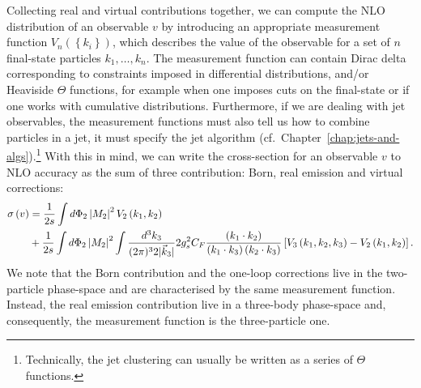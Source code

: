 Collecting real and virtual contributions together, we can compute the
NLO distribution of an observable $v$ by introducing an
appropriate measurement function
$V_{n}\left(\left\{k_i\right\}\right)$, which describes
%
the value of the observable for a set of $n$ final-state particles
$k_1,\dots,k_n$.
%
The measurement function can contain Dirac delta corresponding to
constraints imposed in differential distributions, and/or Heaviside
$\Theta$ functions, for example when one imposes cuts on the
final-state or if one works with cumulative distributions.
%
Furthermore, if we are dealing with jet observables, the measurement
functions must also tell us how to combine particles in a jet, \ie it
must specify the jet algorithm
(cf.~Chapter~\ref{chap:jets-and-algs}).\footnote{Technically, the jet
  clustering can usually be written as a series of $\Theta$
  functions.}  With this in mind, we can write the cross-section for
an observable $v$ to NLO accuracy as the sum of three contribution:
Born, real emission and virtual corrections:
\begin{align}\label{eq:real-virtual-together}
\sigma\left(v\right)&=\frac{1}{2s}\int d\Phi_2\left|M_2\right|^{2}V_2\left(k_1,k_2\right)\\
&+\frac{1}{2s}\int d\Phi_2\left|M_2\right|^{2}\int\frac{d^{3}k_3}{(2\pi)^{3}2 | \vec{k}_3|}2 g_s^{2}C_{F}\frac{\left(k_1\cdot k_2\right)}{\left(k_1\cdot k_3\right)\left(k_2\cdot k_3\right)}
  \left[V_{3}\left(k_1,k_2,k_3\right)-V_2\left(k_1,k_2\right)\right].\nonumber
\end{align}
We note that the Born contribution and the one-loop corrections live in the two-particle phase-space and are characterised by the same measurement function. Instead, the real emission contribution live in a three-body phase-space and, consequently, the measurement function is the three-particle one. 


